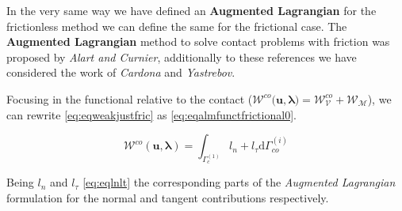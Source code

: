 \documentclass[a4paper,10pt]{article} %
\begin{document}
In the very same way we have defined an \textbf{Augmented Lagrangian} for the frictionless method we can define the same for the frictional case. The \textbf{Augmented Lagrangian} method to solve contact problems with friction was proposed by \textit{Alart and Curnier}\cite{alart}, additionally to these references we have considered the work of \textit{Cardona}\cite{cardona3} and \textit{Yastrebov}\cite{yastrebov}.

Focusing in the functional relative to the contact ($\mathcal{W}^{co}(\mathbf{u},\boldsymbol{\lambda)} = \mathcal{W}^{co}_\mathcal{V} + \mathcal{W}_\mathcal{M}$), we can rewrite \eqref{eq:eqweakjustfric} as \eqref{eq:eqalmfunctfrictional0}.

\begin{equation}\label{eq:eqalmfunctfrictional0}
 \mathcal{W}^{co}(\mathbf{u},\boldsymbol{\lambda}) = \int_{\Gamma_c^{(1)}} l_n + l_\tau \text{d}\Gamma_{co}^{(i)}
\end{equation}

Being $l_n$ and $l_\tau$ \eqref{eq:eqlnlt} the corresponding parts of the \textit{Augmented Lagrangian} formulation for the normal and tangent contributions respectively.
\end{document}
